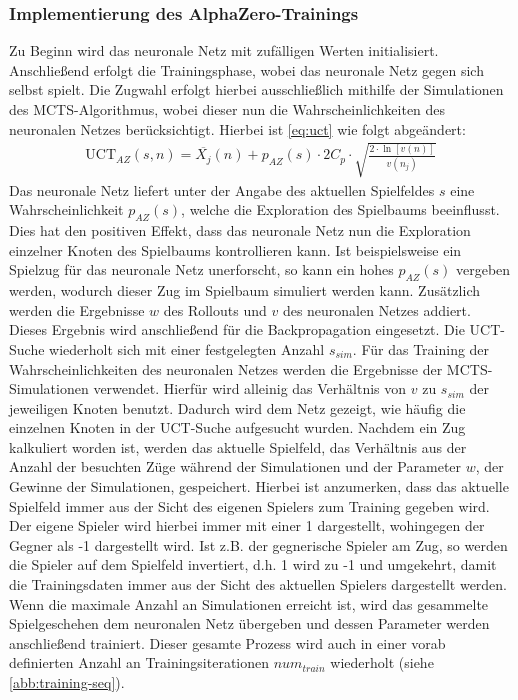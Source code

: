 \documentclass[12pt,a4paper,bibliography=totocnumbered,listof=totocnumbered]{article}
\begin{document}
\subsubsection{Implementierung des AlphaZero-Trainings}
Zu Beginn wird das neuronale Netz mit zufälligen Werten initialisiert. Anschließend erfolgt die Trainingsphase, wobei das neuronale Netz gegen sich selbst spielt. Die Zugwahl erfolgt hierbei ausschließlich mithilfe der Simulationen des MCTS-Algorithmus, wobei dieser nun die Wahrscheinlichkeiten des neuronalen Netzes berücksichtigt. Hierbei ist \autoref{eq:uct} wie folgt abgeändert:
\begin{align}
\text{UCT}_{AZ}(s, n) = \overline{X_{j}}(n) + p_{AZ}(s) \cdot 2C_{p} \cdot \sqrt{\frac{2 \cdot \ln{[v(n)]}}{v(n_{j})} }
\label{eq:az_new}
\end{align} 
Das neuronale Netz liefert unter der Angabe des aktuellen Spielfeldes $s$ eine Wahrscheinlichkeit $p_{AZ}(s)$, welche die Exploration des Spielbaums beeinflusst. Dies hat den positiven Effekt, dass das neuronale Netz nun die Exploration einzelner Knoten des Spielbaums kontrollieren kann. Ist beispielsweise ein Spielzug für das neuronale Netz unerforscht, so kann ein hohes $p_{AZ}(s)$ vergeben werden, wodurch dieser Zug im Spielbaum simuliert werden kann. Zusätzlich werden die Ergebnisse $w$ des Rollouts und $v$ des neuronalen Netzes addiert. Dieses Ergebnis wird anschließend für die Backpropagation eingesetzt. Die UCT-Suche wiederholt sich mit einer festgelegten Anzahl $s_{sim}$. Für das Training der Wahrscheinlichkeiten des neuronalen Netzes werden die Ergebnisse der MCTS-Simulationen verwendet. Hierfür wird alleinig das Verhältnis von $v$ zu $s_{sim}$ der jeweiligen Knoten benutzt. Dadurch wird dem Netz gezeigt, wie häufig die einzelnen Knoten in der UCT-Suche aufgesucht wurden. Nachdem ein Zug kalkuliert worden ist, werden das aktuelle Spielfeld, das Verhältnis aus der Anzahl der besuchten Züge während der Simulationen und der Parameter $w$, der Gewinne der Simulationen, gespeichert. Hierbei ist anzumerken, dass das aktuelle Spielfeld immer aus der Sicht des eigenen Spielers zum Training gegeben wird. Der eigene Spieler wird hierbei immer mit einer 1 dargestellt, wohingegen der Gegner als -1 dargestellt wird. Ist z.B. der gegnerische Spieler am Zug, so werden die Spieler auf dem Spielfeld invertiert, d.h. 1 wird zu -1 und umgekehrt, damit die Trainingsdaten immer aus der Sicht des aktuellen Spielers dargestellt werden. Wenn die maximale Anzahl an Simulationen erreicht ist, wird das gesammelte Spielgeschehen dem neuronalen Netz übergeben und dessen Parameter werden anschließend trainiert. Dieser gesamte Prozess wird auch in einer vorab definierten Anzahl an Trainingsiterationen $num_{train}$ wiederholt (siehe \autoref{abb:training-seq}).
\end{document}
